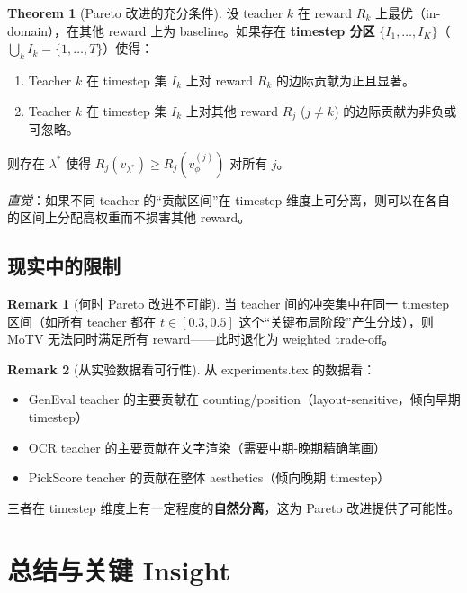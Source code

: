 \documentclass[11pt,a4paper]{article}
\newcommand{\vphi}{v_\phi}
\theoremstyle{definition}
\newtheorem{remark}{Remark}
\newtheorem{theorem}{Theorem}
\begin{document}
\begin{theorem}[Pareto 改进的充分条件]
\label{thm:pareto}
设 teacher $k$ 在 reward $R_k$ 上最优（in-domain），在其他 reward 上为 baseline。如果存在 \textbf{timestep 分区} $\{I_1, \ldots, I_K\}$（$\bigcup_k I_k = \{1, \ldots, T\}$）使得：
\begin{enumerate}[leftmargin=1.5em]
\item Teacher $k$ 在 timestep 集 $I_k$ 上对 reward $R_k$ 的边际贡献为正且显著。
\item Teacher $k$ 在 timestep 集 $I_k$ 上对其他 reward $R_j$ ($j \neq k$) 的边际贡献为非负或可忽略。
\end{enumerate}
则存在 $\lambda^*$ 使得 $R_j(v_{\lambda^*}) \geq R_j(\vphi^{(j)})$ 对所有 $j$。

\textit{直觉}：如果不同 teacher 的``贡献区间''在 timestep 维度上可分离，则可以在各自的区间上分配高权重而不损害其他 reward。
\end{theorem}

\subsection{现实中的限制}

\begin{remark}[何时 Pareto 改进不可能]
当 teacher 间的冲突集中在同一 timestep 区间（如所有 teacher 都在 $t \in [0.3, 0.5]$ 这个``关键布局阶段''产生分歧），则 MoTV 无法同时满足所有 reward——此时退化为 weighted trade-off。
\end{remark}

\begin{remark}[从实验数据看可行性]
从 experiments.tex 的数据看：
\begin{itemize}
\item GenEval teacher 的主要贡献在 counting/position（layout-sensitive，倾向早期 timestep）
\item OCR teacher 的主要贡献在文字渲染（需要中期-晚期精确笔画）
\item PickScore teacher 的贡献在整体 aesthetics（倾向晚期 timestep）
\end{itemize}
三者在 timestep 维度上有一定程度的\textbf{自然分离}，这为 Pareto 改进提供了可能性。
\end{remark}

\section{总结与关键 Insight}
\label{sec:summary}
\end{document}
